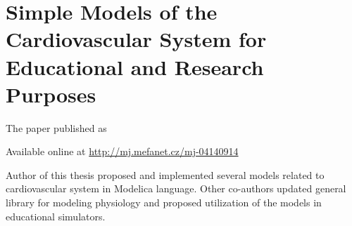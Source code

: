 \chapter{Simple Models of the Cardiovascular System for Educational and Research Purposes}\label{app:simplemodelsd}
The paper \cite{Kulhanek2014mefanet} published as
 

Available online at \url{http://mj.mefanet.cz/mj-04140914}

Author of this thesis proposed and implemented several models related to cardiovascular system in Modelica language. Other co-authors updated general library for modeling physiology and proposed utilization of the models in educational simulators.


